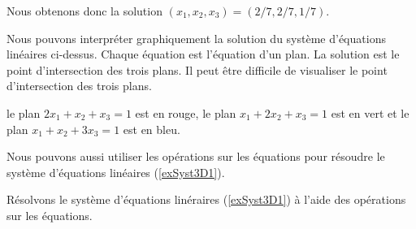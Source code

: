 {\begin{egg}
Nous obtenons donc la solution $(x_1,x_2,x_3)=(2/7,2/7,1/7)$.

Nous pouvons interpréter graphiquement la solution du système d'équations
linéaires ci-dessus.  Chaque équation est l'équation d'un plan.  La
solution est le point d'intersection des trois plans.
Il peut être difficile de visualiser le point d'intersection des trois
plans.

\noindent le plan $2x_1 + x_2 + x_3 = 1$ est en rouge, le plan
$x_1 + 2x_2 + x_3 = 1$ est en vert et le plan $x_1 + x_2 + 3x_3 = 1$
est en bleu.
\end{egg}

Nous pouvons aussi utiliser les opérations sur les équations pour résoudre
le système d'équations linéaires (\ref{exSyst3D1}).

\begin{egg}
Résolvons le système d'équations linéraires (\ref{exSyst3D1}) à l'aide des
opérations sur les équations.


\end{egg}}
